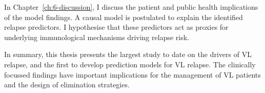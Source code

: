 In Chapter~\ref{ch:6-discussion}, I discuss the patient and public health implications of the model findings. A causal model is postulated to explain the identified relapse predictors. I hypothesise that these predictors act as proxies for underlying immunological mechanisms driving relapse risk.

In summary, this thesis presents the largest study to date on the drivers of VL relapse, and the first to develop prediction models for VL relapse. The clinically focussed findings have important implications for the management of VL patients and the design of elimination strategies.